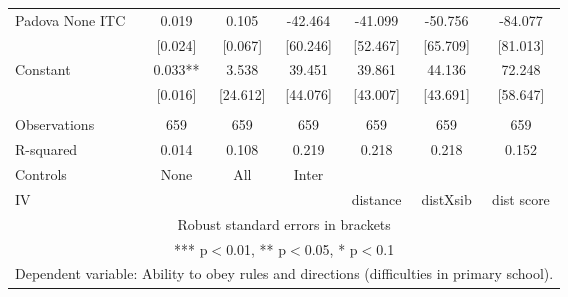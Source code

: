\begin{tabular}{lcccccc}
Padova None ITC & 0.019 & 0.105 & -42.464 & -41.099 & -50.756 & -84.077 \\
 & [0.024] & [0.067] & [60.246] & [52.467] & [65.709] & [81.013] \\
Constant & 0.033** & 3.538 & 39.451 & 39.861 & 44.136 & 72.248 \\
 & [0.016] & [24.612] & [44.076] & [43.007] & [43.691] & [58.647] \\
 &  &  &  &  &  &  \\
Observations & 659 & 659 & 659 & 659 & 659 & 659 \\
R-squared & 0.014 & 0.108 & 0.219 & 0.218 & 0.218 & 0.152 \\
Controls & None & All & Inter &  &  &  \\
 IV &  &  &  & distance & distXsib & dist score \\ \hline
\multicolumn{7}{c}{ Robust standard errors in brackets} \\
\multicolumn{7}{c}{ *** p$<$0.01, ** p$<$0.05, * p$<$0.1} \\
\multicolumn{7}{c}{ Dependent variable: Ability to obey rules and directions (difficulties in primary school).} \\
\end{tabular}
